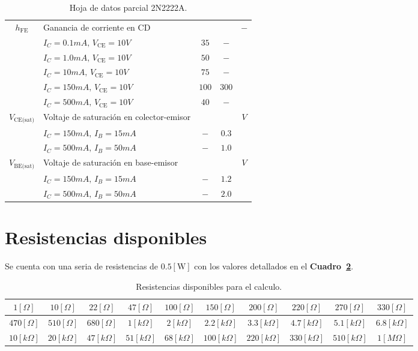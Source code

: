 \documentclass[letter,twoside,11pt]{article}
\begin{document}
\begin{table}[!h]
\begin{center}
\begin{tabular}{|c|l|c|c|c|}
    $h_{\text{FE}}$ &
    Ganancia de corriente en CD & & & $-$
    \tabularnewline
    & $I_C = 0.1mA,\,V_{\text{CE}} = 10V$ &  $35$ &   $-$ & \tabularnewline
    & $I_C = 1.0mA,\,V_{\text{CE}} = 10V$ &  $50$ &   $-$ & \tabularnewline
    & $I_C =  10mA,\,V_{\text{CE}} = 10V$ &  $75$ &   $-$ & \tabularnewline
    & $I_C = 150mA,\,V_{\text{CE}} = 10V$ & $100$ & $300$ & \tabularnewline
    & $I_C = 500mA,\,V_{\text{CE}} = 10V$ &  $40$ &   $-$ &
    \tabularnewline \hline
    $V_{\text{CE(sat)}}$ &
    Voltaje de saturación en colector-emisor & & & $V$
    \tabularnewline
    & $I_C = 150mA,\,I_B = 15mA$ & $-$ & $0.3$ & \tabularnewline
    & $I_C = 500mA,\,I_B = 50mA$ & $-$ & $1.0$ &
    \tabularnewline \hline
    $V_{\text{BE(sat)}}$ &
    Voltaje de saturación en base-emisor & & & $V$
    \tabularnewline
    & $I_C = 150mA,\,I_B = 15mA$ & $-$ & $1.2$ & \tabularnewline
    & $I_C = 500mA,\,I_B = 50mA$ & $-$ & $2.0$ &
    \tabularnewline \hline
    \end{tabular}
\end{center}
\caption{Hoja de datos parcial 2N2222A.}
\label{hojadedatos}
\end{table}

\section{Resistencias disponibles}
Se cuenta con una seria de resistencias de $0.5[\text{W}]$ con los valores
detallados en el \textbf{Cuadro~\ref{resistencias}}.

\begin{table}
\begin{center}
    \begin{tabular}{|c|c|c|c|c|c|c|c|c|c|}
    \hline
    $1[\Omega]$ & $10[\Omega]$ & $22[\Omega]$ & $47[\Omega]$ & $100[\Omega]$ &
    $150[\Omega]$ & $200[\Omega]$ & $220[\Omega]$ & $270[\Omega]$ &
    $330[\Omega]$
    \tabularnewline \hline
    $470[\Omega]$ & $510[\Omega]$ & $680[\Omega]$ & $1[k{\Omega}]$ &
    $2[k{\Omega}]$ & $2.2[k{\Omega}]$ & $3.3[k{\Omega}]$ & $4.7[k{\Omega}]$ &
    $5.1[k{\Omega}]$ & $6.8[k{\Omega}]$
    \tabularnewline \hline
    $10[k{\Omega}]$ & $20[k{\Omega}]$ & $47[k{\Omega}]$ & $51[k{\Omega}]$ &
    $68[k{\Omega}]$ & $100[k{\Omega}]$ & $220[k{\Omega}]$ & $330[k{\Omega}]$ &
    $510[k{\Omega}]$ & $1[M{\Omega}]$
    \tabularnewline \hline
    \end{tabular}
\end{center}
\caption{Resistencias disponibles para el calculo.}
\label{resistencias}
\end{table}
\end{document}
